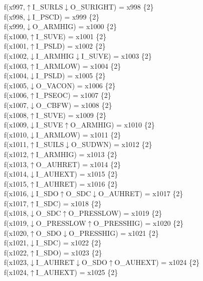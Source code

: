 f(x997,$\uparrow$I\_SURLS$\downarrow$O\_SURIGHT) = x998 \{2\} \\  
f(x998,$\downarrow$I\_PSCD) = x999 \{2\} \\  
f(x999,$\downarrow$O\_ARMHIG) = x1000 \{2\} \\  
f(x1000,$\uparrow$I\_SUVE) = x1001 \{2\} \\  
f(x1001,$\uparrow$I\_PSLD) = x1002 \{2\} \\  
f(x1002,$\downarrow$I\_ARMHIG$\downarrow$I\_SUVE) = x1003 \{2\} \\  
f(x1003,$\uparrow$I\_ARMLOW) = x1004 \{2\} \\  
f(x1004,$\downarrow$I\_PSLD) = x1005 \{2\} \\  
f(x1005,$\downarrow$O\_VACON) = x1006 \{2\} \\  
f(x1006,$\uparrow$I\_PSEOC) = x1007 \{2\} \\  
f(x1007,$\downarrow$O\_CBFW) = x1008 \{2\} \\  
f(x1008,$\uparrow$I\_SUVE) = x1009 \{2\} \\  
f(x1009,$\downarrow$I\_SUVE$\uparrow$O\_ARMHIG) = x1010 \{2\} \\  
f(x1010,$\downarrow$I\_ARMLOW) = x1011 \{2\} \\  
f(x1011,$\uparrow$I\_SUILS$\downarrow$O\_SUDWN) = x1012 \{2\} \\  
f(x1012,$\uparrow$I\_ARMHIG) = x1013 \{2\} \\  
f(x1013,$\uparrow$O\_AUHRET) = x1014 \{2\} \\  
f(x1014,$\downarrow$I\_AUHEXT) = x1015 \{2\} \\  
f(x1015,$\uparrow$I\_AUHRET) = x1016 \{2\} \\  
f(x1016,$\downarrow$I\_SDO$\uparrow$O\_SDC$\downarrow$O\_AUHRET) = x1017 \{2\} \\  
f(x1017,$\uparrow$I\_SDC) = x1018 \{2\} \\  
f(x1018,$\downarrow$O\_SDC$\uparrow$O\_PRESSLOW) = x1019 \{2\} \\  
f(x1019,$\downarrow$O\_PRESSLOW$\uparrow$O\_PRESSHIG) = x1020 \{2\} \\  
f(x1020,$\uparrow$O\_SDO$\downarrow$O\_PRESSHIG) = x1021 \{2\} \\  
f(x1021,$\downarrow$I\_SDC) = x1022 \{2\} \\  
f(x1022,$\uparrow$I\_SDO) = x1023 \{2\} \\  
f(x1023,$\downarrow$I\_AUHRET$\downarrow$O\_SDO$\uparrow$O\_AUHEXT) = x1024 \{2\} \\  
f(x1024,$\uparrow$I\_AUHEXT) = x1025 \{2\} \\  
